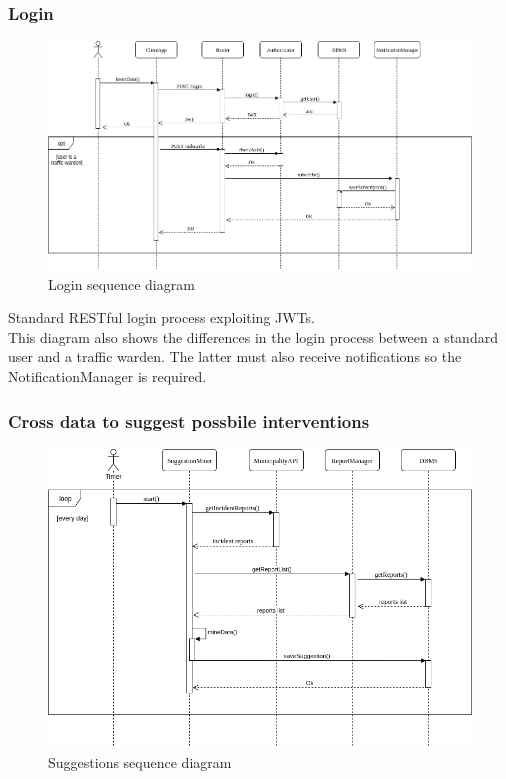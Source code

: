 \documentclass{article}
\begin{document}
\subsubsection{Login}
\begin{figure}[!htb]
\centering
	\includegraphics[width=1.0\textwidth]{images/login-sequence-diagram.png}
	\caption{Login sequence diagram}
	\label{fig:login-sequence-diagram}
\end{figure}
Standard RESTful login process exploiting JWTs. \\
This diagram also shows the differences in the login process between a standard user and a traffic warden. The latter must also receive notifications so the NotificationManager is required.

\newpage
\subsubsection{Cross data to suggest possbile interventions}
\begin{figure}[!htb]
\centering
	\includegraphics[width=1.0\textwidth]{images/miner-sequence-diagram.png}
	\caption{Suggestions sequence diagram}
	\label{fig:miner-sequence-diagram}
\end{figure}
\end{document}
